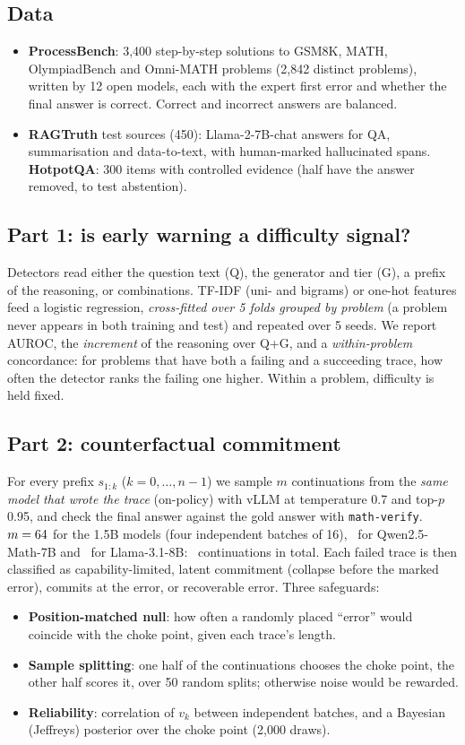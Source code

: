 \documentclass[11pt,a4paper]{article}
\begin{document}
\subsection{Data}
\begin{itemize}
\item \textbf{ProcessBench}: 3,400 step-by-step solutions to GSM8K, MATH, OlympiadBench and
Omni-MATH problems (2,842 distinct problems), written by 12 open models, each with the expert first
error and whether the final answer is correct. Correct and incorrect answers are balanced.
\item \textbf{RAGTruth} test sources (450): Llama-2-7B-chat answers for QA, summarisation and
data-to-text, with human-marked hallucinated spans. \textbf{HotpotQA}: 300 items with controlled
evidence (half have the answer removed, to test abstention).
\end{itemize}

\subsection{Part 1: is early warning a difficulty signal?}
Detectors read either the question text (Q), the generator and tier (G), a prefix of the reasoning,
or combinations. TF-IDF (uni- and bigrams) or one-hot features feed a logistic regression,
\emph{cross-fitted over 5 folds grouped by problem} (a problem never appears in both training and
test) and repeated over 5 seeds. We report AUROC, the \emph{increment} of the reasoning over Q+G, and
a \emph{within-problem} concordance: for problems that have both a failing and a succeeding trace,
how often the detector ranks the failing one higher. Within a problem, difficulty is held fixed.

\subsection{Part 2: counterfactual commitment}
For every prefix $s_{1:k}$ ($k=0,\dots,n-1$) we sample $m$ continuations from the \emph{same model that
wrote the trace} (on-policy) with vLLM at temperature 0.7 and top-$p$ 0.95, and check the final
answer against the gold answer with \texttt{math-verify}. $m=64$ for the 1.5B models
(four independent batches of 16), \QwenMathM\ for Qwen2.5-Math-7B and \LlamaM\ for Llama-3.1-8B:
\TotalRollouts\ continuations in total. Each failed trace is then classified as capability-limited,
latent commitment (collapse before the marked error), commits at the error, or recoverable error.
Three safeguards:
\begin{itemize}
\item \textbf{Position-matched null}: how often a randomly placed ``error'' would coincide with the
choke point, given each trace's length.
\item \textbf{Sample splitting}: one half of the continuations chooses the choke point, the other
half scores it, over 50 random splits; otherwise noise would be rewarded.
\item \textbf{Reliability}: correlation of $v_k$ between independent batches, and a Bayesian
(Jeffreys) posterior over the choke point (2,000 draws).
\end{itemize}
\end{document}
